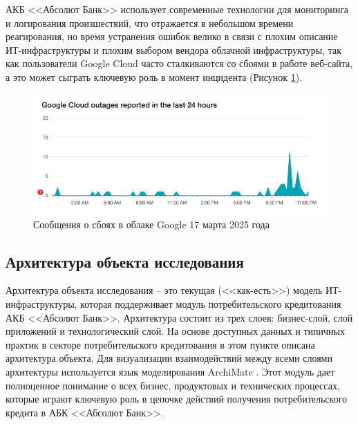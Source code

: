\documentclass[14pt, a4paper]{extarticle}
\begin{document}
АКБ <<Абсолют Банк>> использует современные технологии для мониторинга и
логирования произшествий, что отражается в небольшом времени реагирования, но
время устранения ошибок велико в связи с плохим описание ИТ-инфраструктуры и
плохим выбором вендора облачной инфраструктуры, так как пользователи Google
Cloud часто сталкиваются со сбоями в работе веб-сайта, а это может
сыграть ключевую роль в момент инцидента (Рисунок
\ref{fig:google_cloud_downtime}).

\begin{figure}[H]
	\centering
	\includegraphics[scale=0.48]{google_cloud_downtime.png}
	\caption{Сообщения о сбоях в облаке Google 17 марта 2025 года}
	\label{fig:google_cloud_downtime}
\end{figure}

\subsection{Архитектура объекта исследования}

Архитектура объекта исследования -- это текущая (<<как-есть>>) модель
ИТ-инфраструктуры, которая поддерживает модуль потребительского кредитования
АКБ <<Абсолют Банк>>. Архитектура состоит из трех слоев: бизнес-слой, слой
приложений и технологический слой. На основе доступных данных и типичных
практик в секторе потребительского кредитования в этом пункте описана
архитектура объекта. Для визуализации взаимодействий между всеми слоями
архитектуры используется язык моделирования ArchiMate \cite{archimate-landing}.
Этот модуль дает полноценное понимание о всех бизнес, продуктовых и технических
процессах, которые играют ключевую роль в цепочке действий получения
потребительского кредита в АБК <<Абсолют Банк>>.
\end{document}
